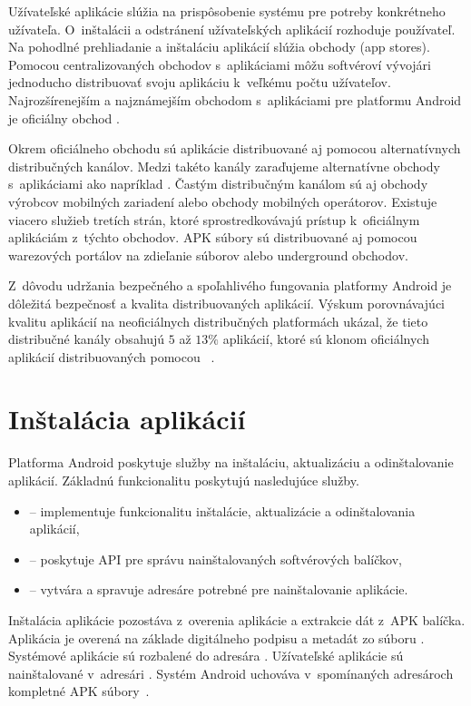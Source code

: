 Užívateľské aplikácie slúžia na prispôsobenie systému pre potreby konkrétneho užívateľa. O~inštalácii a odstránení užívateľských aplikácií rozhoduje používateľ. Na pohodlné prehliadanie a inštaláciu aplikácií slúžia obchody (app stores). Pomocou centralizovaných obchodov s~aplikáciami môžu softvéroví vývojári jednoducho distribuovať svoju aplikáciu k~veľkému počtu užívateľov.  Najrozšírenejším a najznámejším obchodom s~aplikáciami pre platformu Android je oficiálny obchod . 

Okrem oficiálneho obchodu sú aplikácie distribuované aj pomocou alternatívnych distribučných kanálov. Medzi takéto kanály zaraďujeme alternatívne obchody s~aplikáciami ako napríklad . Častým distribučným kanálom sú aj obchody výrobcov mobilných zariadení alebo obchody mobilných operátorov. Existuje viacero služieb tretích strán, ktoré sprostredkovávajú prístup k~oficiálnym aplikáciám z~týchto obchodov. APK súbory sú distribuované aj pomocou warezových portálov na zdieľanie súborov alebo underground obchodov. 

Z~dôvodu udržania bezpečného a spoľahlivého fungovania platformy Android je dôležitá bezpečnosť a kvalita distribuovaných aplikácií. Výskum porovnávajúci kvalitu aplikácií na neoficiálnych distribučných platformách ukázal, že tieto distribučné kanály obsahujú $5$ až $13\%$ aplikácií, ktoré sú klonom oficiálnych aplikácií distribuovaných pomocou ~\cite{Zhou2012}.

\section{Inštalácia aplikácií}

Platforma Android poskytuje služby na inštaláciu, aktualizáciu a odinštalovanie aplikácií. \newline
Základnú funkcionalitu poskytujú nasledujúce služby.
\begin{itemize}
	\item {} -- implementuje funkcionalitu inštalácie, aktualizácie a odinštalovania aplikácií,
	\item {} -- poskytuje API pre správu nainštalovaných softvérových balíčkov,
	\item {} -- vytvára a spravuje adresáre potrebné pre nainštalovanie aplikácie.
\end{itemize}
Inštalácia aplikácie pozostáva z~overenia aplikácie a extrakcie dát z~APK balíčka. Aplikácia je overená na základe digitálneho podpisu a metadát zo súboru . Systémové aplikácie sú rozbalené do adresára . Užívateľské aplikácie sú nainštalované v~adresári . Systém Android uchováva v~spomínaných adresároch kompletné APK súbory~\cite{AndroidDeveloper}.

